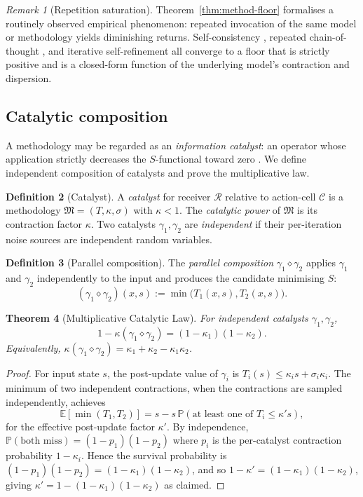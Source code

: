 \documentclass[11pt,twocolumn,a4paper]{article}
\newtheorem{theorem}{Theorem}[section]
\theoremstyle{definition}
\newtheorem{definition}[theorem]{Definition}
\theoremstyle{remark}
\newtheorem{remark}[theorem]{Remark}
\newcommand{\E}{\mathbb{E}}
\newcommand{\Prob}{\mathbb{P}}
\newcommand{\Cell}{\mathcal{C}}
\newcommand{\Method}{\mathfrak{M}}
\newcommand{\receiver}{\mathcal{R}}
\newcommand{\Sscalar}{S}
\newcommand{\catpow}{\kappa}
\newcommand{\disp}{\sigma}
\newcommand{\Compose}{\diamond}
\begin{document}
\begin{remark}[Repetition saturation]
Theorem~\ref{thm:method-floor} formalises a routinely observed empirical phenomenon: repeated invocation of the same model or methodology yields diminishing returns. Self-consistency \citep{wang2022self}, repeated chain-of-thought \citep{wei2022chain}, and iterative self-refinement \citep{madaan2023self} all converge to a floor that is strictly positive and is a closed-form function of the underlying model's contraction and dispersion.
\end{remark}

\subsection{Catalytic composition}

A methodology may be regarded as an \emph{information catalyst}: an operator whose application strictly decreases the $\Sscalar$-functional toward zero \citep{kelly1956new}. We define independent composition of catalysts and prove the multiplicative law.

\begin{definition}[Catalyst]
\label{def:catalyst}
A \emph{catalyst} for receiver $\receiver$ relative to action-cell $\Cell$ is a methodology $\Method = (T, \catpow, \disp)$ with $\catpow < 1$. The \emph{catalytic power} of $\Method$ is its contraction factor $\catpow$. Two catalysts $\gamma_1, \gamma_2$ are \emph{independent} if their per-iteration noise sources are independent random variables.
\end{definition}

\begin{definition}[Parallel composition]
\label{def:parallel}
The \emph{parallel composition} $\gamma_1 \Compose \gamma_2$ applies $\gamma_1$ and $\gamma_2$ independently to the input and produces the candidate minimising $\Sscalar$:
\[
(\gamma_1 \Compose \gamma_2)(x, s) := \min\!\big(T_1(x, s), T_2(x, s)\big).
\]
\end{definition}

\begin{theorem}[Multiplicative Catalytic Law]
\label{thm:catalytic}
For independent catalysts $\gamma_1, \gamma_2$,
\[
1 - \catpow(\gamma_1 \Compose \gamma_2) = (1 - \catpow_1)(1 - \catpow_2).
\]
Equivalently, $\catpow(\gamma_1 \Compose \gamma_2) = \catpow_1 + \catpow_2 - \catpow_1 \catpow_2$.
\end{theorem}

\begin{proof}
For input state $s$, the post-update value of $\gamma_i$ is $T_i(s) \leq \catpow_i s + \disp_i \catpow_i$. The minimum of two independent contractions, when the contractions are sampled independently, achieves
\[
\E[\min(T_1, T_2)] = s - s\,\Prob(\text{at least one of } T_i \leq \catpow' s),
\]
for the effective post-update factor $\catpow'$. By independence, $\Prob(\text{both miss}) = (1 - p_1)(1-p_2)$ where $p_i$ is the per-catalyst contraction probability $1 - \catpow_i$. Hence the survival probability is $(1-p_1)(1-p_2) = (1-\catpow_1)(1-\catpow_2)$, and so
$1 - \catpow' = (1-\catpow_1)(1-\catpow_2)$, giving $\catpow' = 1 - (1-\catpow_1)(1-\catpow_2)$ as claimed.
\end{proof}
\end{document}
